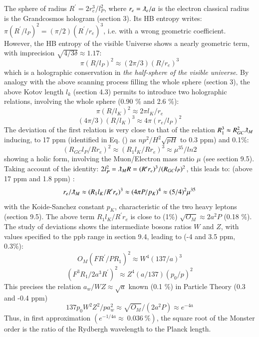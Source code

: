 \documentclass[twoside,draft]{article}
\begin{document}
\begin{sloppypar}
The sphere of radius $R^{\prime} = 2r_e^3 / l_P^ 2$, where $r_e = \lambdabar_e /a $ is the electron classical radius is the Grandcosmos hologram (section 3). Its HB entropy writes: $\pi (R^{\prime}/l_P)^2 = (\pi /2)(R^{\prime}/r_e)^3 $, i.e. with a wrong geometric coefficient. However, the HB entropy of the visible Universe shows a nearly geometric term, with imprecision $\sqrt{4/3\delta} \approx 1.17$:
\begin{equation}
\pi(R/l_P)^2 \approx (2\pi/3)(R/r_e)^3 
\end{equation}
which is a holographic conservation in \textit{the half-sphere of the visible universe}. By analogy with the above scanning process filling the whole sphere (section 3), the above Kotov length $l_k$ (section 4.3) permits to introduce two holographic relations, involving the whole sphere (0.90 \% and 2.6 \%):
\begin{equation}
\pi(R/l_K)^2 \approx 2\pi l_K/r_e 
\end{equation}
\begin{equation}
(4\pi/3)(R/l_K)^3 \approx 4\pi (r_e/l_P)^2 
\end{equation}
The deviation of the first relation is very close to that of the relation $R_1^3 \approx R_{GC}^2 \lambdabar_M$ inducing, to 17 ppm (identified in Eq. () as $np^2/H^2\sqrt{pH}$ to 0.3 ppm) and 0.1\%: 
\begin{equation}
 (R_{GC}l_P/Rr_e)^2 \approx (R_1l_K/Rr_e)^3 \approx \mu^{35}/ln2
\end{equation}
showing a holic form, involving the Muon/Electron mass ratio $\mu$ (see section 9.5).
Taking account of the identity: $2l_P^2 = \lambdabar_M R = (R^{\prime}r_e)^3/(R_{GC}l_P)^2$, this leads to:  (above 17 ppm and 1.8 ppm) :
\begin{equation}
r_e/\lambdabar_M \approx (R_1l_K/R^{\prime}r_e)^3 \approx (4\pi P/p_K)^4
\approx (5/4)^2 \mu ^{35} \end{equation}
with the Koide-Sanchez constant $p_K$, characteristic of the two heavy leptons (section 9.5).
The above term $R_1l_K/R^{\prime}r_e$ is close to (1\%) $\sqrt{O_M} \approx 2a^2P$ (0.18 \%). The study of deviations shows the intermediate bosons ratios $W$ and $Z$, with values specified to the ppb range in section 9.4, leading to (-4 and 3.5 ppm, 0.3\%):
\begin{equation}
O_M (FR^{\prime}/PR_1)^2 \approx W^4 (137/a)^3
\end{equation}
\begin{equation}
 (F^3R_1 / 2 a^3R^{\prime})^2 \approx Z^4 (a/137)(p_0/p)^2
\end{equation}
This precises the relation $a_w/WZ \approx \sqrt{a}$ known (0.1 \%) in Particle Theory (0.3 and -0.4 ppm)
\begin{equation}
137 p_0 W^2 Z^2/p a_w^2 \approx \sqrt{O_M}/(2a^2 P) \approx e^{-4a}
\end{equation}   
Thus, in first approximation $(e^{-1/4a} \approx ~0.036 ~\%)$, the square root of the Monster order is the ratio of the Rydbergh wavelength to the Planck length.








\end{sloppypar}
\end{document}
